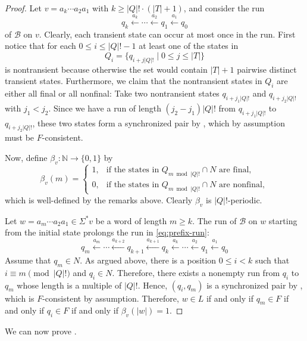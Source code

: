 \documentclass{article}\usepackage[a4paper,margin=20mm]{geometry}
\newcommand{\N}{\mathbb{N}}
\newcommand{\B}{\mathcal{B}}
\renewcommand{\geq}{\geqslant}
\renewcommand{\leq}{\leqslant}
\renewcommand{\ge}{\geq}
\renewcommand{\le}{\leq}
\begin{document}
\begin{proof}
	Let $v = a_k \cdots a_2 a_1$  with
	$k \ge |Q|! \cdot (|T|+1)$, and consider the run
	\begin{equation}
		\label{eq:prefix-run}
		q_k \xleftarrow{a_k} \cdots \xleftarrow{a_2} q_1 \xleftarrow{a_1} q_0
	\end{equation}
	of $\B$ on $v$.
	Clearly, each transient state can occur at most once in the run.
	First notice that for each $0 \le i \le |Q|!-1$ at least one of the states in
	\[
		Q_i = \{ q_{i+j|Q|!} \mid 0 \le j \le |T| \}
	\]
	is nontransient because otherwise the set would contain $|T|+1$ pairwise distinct transient states.
	Furthermore, we claim that the nontransient states in $Q_i$ are either all final or all nonfinal:
	Take two nontransient states $q_{i+j_1|Q|!}$ and $q_{i+j_2|Q|!}$ with $j_1 < j_2$.
	Since we have a run of length $(j_2-j_1)|Q|!$ from $q_{i+j_1|Q|!}$ to $q_{i+j_2|Q|!}$,
	these two states form a synchronized pair by , which by assumption must
	be $F$-consistent.
	
	Now, define $\beta_v \colon \N \to \{0,1\}$ by
	\[
		\beta_v(m) = \begin{cases}
		1, & \text{if the states in } Q_{m \bmod |Q|!} \cap N \text{ are final}, \\
		0, & \text{if the states in } Q_{m \bmod |Q|!} \cap N \text{ are nonfinal},
		\end{cases}
	\]
	which is well-defined by the remarks above.
	Clearly $\beta_v$ is $|Q|!$-periodic.
	
	Let $w = a_m \cdots a_2 a_1 \in \Sigma^* v$ be a word of length $m \ge k$.
	The run of $\B$ on $w$ starting from the initial state prolongs the run in \eqref{eq:prefix-run}:
	\[
		q_m \xleftarrow{a_m} \cdots \xleftarrow{a_{k+2}} q_{k+1} \xleftarrow{a_{k+1}} q_k \xleftarrow{a_k} \cdots \xleftarrow{a_2} q_1 \xleftarrow{a_1} q_0
	\]
	Assume that $q_m \in N$.
	As argued above, there is a position $0 \le i < k$
	such that $i \equiv m \pmod{|Q|!}$ and $q_i \in N$.
	Therefore, there exists a nonempty run from $q_i$ to $q_m$ whose length is a multiple of $|Q|!$.
	Hence, $(q_i,q_m)$ is a synchronized pair by ,
	which is $F$-consistent by assumption.
	Therefore, $w \in L$ if and only if $q_m \in F$ if and only if  $q_i \in F$ if and only if  $\beta_v(|w|) = 1$.
\end{proof}
We can now prove .
\end{document}
